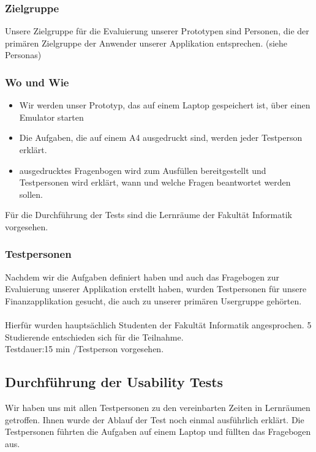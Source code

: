 \documentclass[runningheads,a4paper]{llncs}
\begin{document}
\subsubsection{Zielgruppe}
Unsere Zielgruppe für die Evaluierung unserer Prototypen sind Personen, die der primären Zielgruppe der Anwender unserer Applikation entsprechen. (siehe Personas)

\subsubsection{Wo und Wie}
\begin{itemize}
\item Wir werden unser Prototyp, das auf einem Laptop gespeichert ist, über einen Emulator starten\\
\item Die Aufgaben, die auf einem A4 ausgedruckt sind, werden jeder Testperson erklärt. \\
\item ausgedrucktes Fragenbogen wird zum Ausfüllen bereitgestellt und Testpersonen wird erklärt, wann und welche Fragen beantwortet werden sollen.\\
\end {itemize}
Für die Durchführung der Tests  sind  die Lernräume der Fakultät Informatik vorgesehen.\\

\subsubsection{Testpersonen}
Nachdem wir die Aufgaben definiert haben und auch das Fragebogen zur Evaluierung unserer Applikation erstellt haben, wurden Testpersonen für unsere Finanzapplikation gesucht, die auch zu unserer primären Usergruppe gehörten.\\\\ Hierfür wurden hauptsächlich Studenten der Fakultät Informatik angesprochen.  5 Studierende entschieden sich für die Teilnahme. 
\\
Testdauer:15 min /Testperson vorgesehen.


\subsection{Durchführung der Usability Tests}
Wir haben uns mit allen Testpersonen zu den vereinbarten Zeiten in Lernräumen getroffen. Ihnen wurde der Ablauf der Test noch einmal ausführlich erklärt. Die Testpersonen führten die Aufgaben auf einem Laptop und füllten das Fragebogen aus. \\
\end{document}
